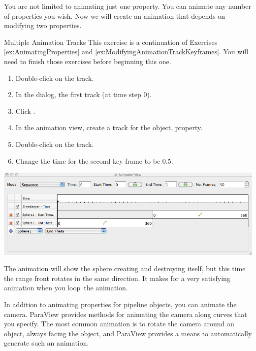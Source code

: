 You are not limited to animating just one property.  You can animate any
number of properties you wish.  Now we will create an animation that
depends on modifying two properties.

\begin{exercise}{Multiple Animation Tracks}
  \label{ex:MultipleAnimationTracks}%
  This exercise is a continuation of Exercises \ref{ex:AnimatingProperties}
  and \ref{ex:ModifyingAnimationTrackKeyframes}.  You will need to finish
  those exercises before beginning this one.

  \begin{enumerate}
  \item Double-click on the  track.
  \item In the  dialog,  the first
    track (at time step 0).
  \item Click .
  \item In the animation view, create a track for the  object,
     property.
  \item Double-click on the  track.
  \item Change the time for the second key frame to be 0.5.
  \end{enumerate}

  \begin{inlinefig}
    \includegraphics[width=.9\linewidth]{images/BuildAnimation3}
  \end{inlinefig}

  The animation will show the sphere creating and destroying itself, but this
  time the range front rotates in the same direction.  It makes for a very
  satisfying animation when you loop~\vcrLoop the animation.
\end{exercise}

In addition to animating properties for pipeline objects, you can animate
the camera.  ParaView provides methods for animating the camera along
curves that you specify.  The most common animation is to rotate the camera
around an object, always facing the object, and ParaView provides a means
to automatically generate such an animation.


